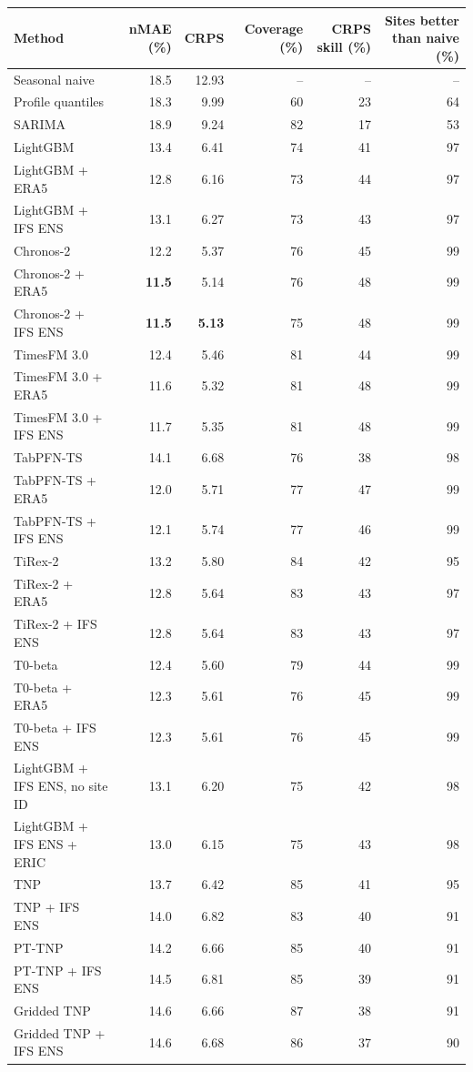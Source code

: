 \begin{tabular}{lrrrrr}
\toprule
Method & nMAE (\%) & CRPS & Coverage (\%) & CRPS skill (\%) & Sites better than naive (\%) \\
\midrule
Seasonal naive & 18.5 & 12.93 & -- & -- & -- \\
Profile quantiles & 18.3 & 9.99 & 60 & 23 & 64 \\
SARIMA & 18.9 & 9.24 & 82 & 17 & 53 \\
\addlinespace[3pt]
LightGBM & 13.4 & 6.41 & 74 & 41 & 97 \\
LightGBM + ERA5 & 12.8 & 6.16 & 73 & 44 & 97 \\
LightGBM + IFS ENS & 13.1 & 6.27 & 73 & 43 & 97 \\
\addlinespace[3pt]
Chronos-2 & 12.2 & 5.37 & 76 & 45 & 99 \\
Chronos-2 + ERA5 & \textbf{11.5} & 5.14 & 76 & 48 & 99 \\
Chronos-2 + IFS ENS & \textbf{11.5} & \textbf{5.13} & 75 & 48 & 99 \\
\addlinespace[3pt]
TimesFM 3.0 & 12.4 & 5.46 & 81 & 44 & 99 \\
TimesFM 3.0 + ERA5 & 11.6 & 5.32 & 81 & 48 & 99 \\
TimesFM 3.0 + IFS ENS & 11.7 & 5.35 & 81 & 48 & 99 \\
\addlinespace[3pt]
TabPFN-TS & 14.1 & 6.68 & 76 & 38 & 98 \\
TabPFN-TS + ERA5 & 12.0 & 5.71 & 77 & 47 & 99 \\
TabPFN-TS + IFS ENS & 12.1 & 5.74 & 77 & 46 & 99 \\
\addlinespace[3pt]
TiRex-2 & 13.2 & 5.80 & 84 & 42 & 95 \\
TiRex-2 + ERA5 & 12.8 & 5.64 & 83 & 43 & 97 \\
TiRex-2 + IFS ENS & 12.8 & 5.64 & 83 & 43 & 97 \\
\addlinespace[3pt]
T0-beta & 12.4 & 5.60 & 79 & 44 & 99 \\
T0-beta + ERA5 & 12.3 & 5.61 & 76 & 45 & 99 \\
T0-beta + IFS ENS & 12.3 & 5.61 & 76 & 45 & 99 \\
\addlinespace[3pt]
LightGBM + IFS ENS, no site ID & 13.1 & 6.20 & 75 & 42 & 98 \\
LightGBM + IFS ENS + ERIC & 13.0 & 6.15 & 75 & 43 & 98 \\
\addlinespace[3pt]
TNP & 13.7 & 6.42 & 85 & 41 & 95 \\
TNP + IFS ENS & 14.0 & 6.82 & 83 & 40 & 91 \\
PT-TNP & 14.2 & 6.66 & 85 & 40 & 91 \\
PT-TNP + IFS ENS & 14.5 & 6.81 & 85 & 39 & 91 \\
Gridded TNP & 14.6 & 6.66 & 87 & 38 & 91 \\
Gridded TNP + IFS ENS & 14.6 & 6.68 & 86 & 37 & 90 \\
\bottomrule
\end{tabular}
